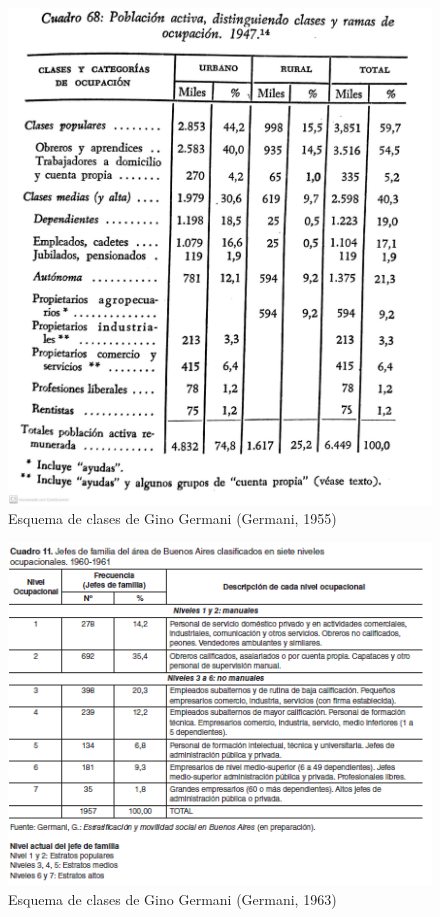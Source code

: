 \documentclass[
]{book}
\begin{document}
\begin{figure}

{\centering \includegraphics[width=0.8\linewidth]{imagenes/germani} 

}

\caption{Esquema de clases de Gino Germani (Germani, 1955)}\label{fig:unnamed-chunk-65}
\end{figure}

\begin{figure}

{\centering \includegraphics[width=0.8\linewidth]{imagenes/germani2} 

}

\caption{Esquema de clases de Gino Germani (Germani, 1963)}\label{fig:unnamed-chunk-66}
\end{figure}
\end{document}
